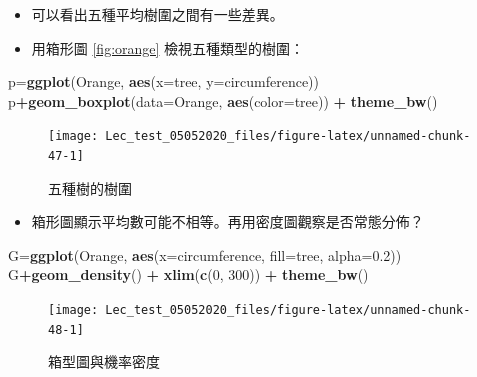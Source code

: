 \documentclass[hyperref,]{ctexart}
\newenvironment{Shaded}{\begin{snugshade}}{\end{snugshade}}
\newcommand{\DataTypeTok}[1]{\textcolor[rgb]{0.13,0.29,0.53}{#1}}
\newcommand{\DecValTok}[1]{\textcolor[rgb]{0.00,0.00,0.81}{#1}}
\newcommand{\FloatTok}[1]{\textcolor[rgb]{0.00,0.00,0.81}{#1}}
\newcommand{\KeywordTok}[1]{\textcolor[rgb]{0.13,0.29,0.53}{\textbf{#1}}}
\newcommand{\NormalTok}[1]{#1}
\newcommand{\OperatorTok}[1]{\textcolor[rgb]{0.81,0.36,0.00}{\textbf{#1}}}
\newcommand{\StringTok}[1]{\textcolor[rgb]{0.31,0.60,0.02}{#1}}
\providecommand{\tightlist}{%
  \setlength{\itemsep}{0pt}\setlength{\parskip}{0pt}}
\begin{document}
\begin{itemize}
\item
  可以看出五種平均樹圍之間有一些差異。
\item
  用箱形圖 \ref{fig:orange} 檢視五種類型的樹圍：
\end{itemize}

\begin{Shaded}
\begin{Highlighting}[]
\NormalTok{p=}\KeywordTok{ggplot}\NormalTok{(Orange, }\KeywordTok{aes}\NormalTok{(}\DataTypeTok{x=}\NormalTok{tree, }\DataTypeTok{y=}\NormalTok{circumference)) }
\NormalTok{p}\OperatorTok{+}\KeywordTok{geom_boxplot}\NormalTok{(}\DataTypeTok{data=}\NormalTok{Orange, }\KeywordTok{aes}\NormalTok{(}\DataTypeTok{color=}\NormalTok{tree)) }\OperatorTok{+}
\StringTok{  }\KeywordTok{theme_bw}\NormalTok{()}
\end{Highlighting}
\end{Shaded}

\begin{figure}

\texttt{[image: Lec\_test\_05052020\_files/figure-latex/unnamed-chunk-47-1]} \hfill{}

\caption{\label{fig:orange}五種樹的樹圍}\label{fig:unnamed-chunk-47}
\end{figure}

\begin{itemize}
\tightlist
\item
  箱形圖顯示平均數可能不相等。再用密度圖觀察是否常態分佈？
\end{itemize}

\begin{Shaded}
\begin{Highlighting}[]
\NormalTok{G=}\KeywordTok{ggplot}\NormalTok{(Orange, }\KeywordTok{aes}\NormalTok{(}\DataTypeTok{x=}\NormalTok{circumference, }\DataTypeTok{fill=}\NormalTok{tree, }\DataTypeTok{alpha=}\FloatTok{0.2}\NormalTok{))}
\NormalTok{G}\OperatorTok{+}\KeywordTok{geom_density}\NormalTok{() }\OperatorTok{+}
\StringTok{   }\KeywordTok{xlim}\NormalTok{(}\KeywordTok{c}\NormalTok{(}\DecValTok{0}\NormalTok{, }\DecValTok{300}\NormalTok{)) }\OperatorTok{+}
\StringTok{   }\KeywordTok{theme_bw}\NormalTok{()}
\end{Highlighting}
\end{Shaded}

\begin{figure}

\texttt{[image: Lec\_test\_05052020\_files/figure-latex/unnamed-chunk-48-1]} \hfill{}

\caption{\label{fig:boxden}箱型圖與機率密度}\label{fig:unnamed-chunk-48}
\end{figure}
\end{document}
